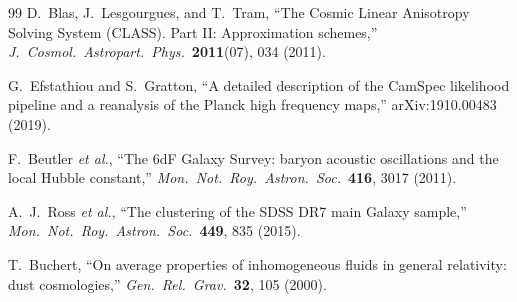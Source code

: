 \documentclass[aps,prd,twocolumn,superscriptaddress,nofootinbib]{revtex4-2}
\begin{document}
\begin{thebibliography}{99}
D.~Blas, J.~Lesgourgues, and T.~Tram,
``The Cosmic Linear Anisotropy Solving System (CLASS). Part II: Approximation schemes,''
\emph{J.\ Cosmol.\ Astropart.\ Phys.}\ \textbf{2011}(07), 034 (2011).

G.~Efstathiou and S.~Gratton,
``A detailed description of the CamSpec likelihood pipeline and a reanalysis of the Planck high frequency maps,''
arXiv:1910.00483 (2019).

F.~Beutler \emph{et al.},
``The 6dF Galaxy Survey: baryon acoustic oscillations and the local Hubble constant,''
\emph{Mon.\ Not.\ Roy.\ Astron.\ Soc.}\ \textbf{416}, 3017 (2011).

A.~J.~Ross \emph{et al.},
``The clustering of the SDSS DR7 main Galaxy sample,''
\emph{Mon.\ Not.\ Roy.\ Astron.\ Soc.}\ \textbf{449}, 835 (2015).

T.~Buchert,
``On average properties of inhomogeneous fluids in general relativity: dust cosmologies,''
\emph{Gen.\ Rel.\ Grav.}\ \textbf{32}, 105 (2000).

\end{thebibliography}
\end{document}
